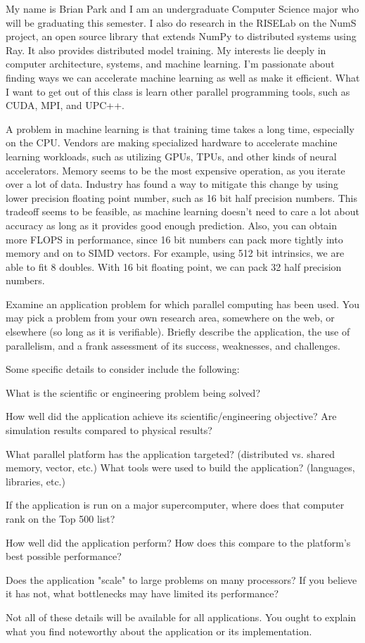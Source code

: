 \documentclass[11pt]{article}
\begin{document}
My name is Brian Park and I am an undergraduate Computer Science major who will be graduating this semester. I also do research in the RISELab on the NumS project, an open source library that extends NumPy to distributed systems using Ray. It also provides distributed model training. My interests lie deeply in computer architecture, systems, and machine learning. I'm passionate about finding ways we can accelerate machine learning as well as make it efficient. What I want to get out of this class is learn other parallel programming tools, such as CUDA, MPI, and UPC++.

A problem in machine learning is that training time takes a long time, especially on the CPU. Vendors are making specialized hardware to accelerate machine learning workloads, such as utilizing GPUs, TPUs, and other kinds of neural accelerators. Memory seems to be the most expensive operation, as you iterate over a lot of data. Industry has found a way to mitigate this change by using lower precision floating point number, such as 16 bit half precision numbers. This tradeoff seems to be feasible, as machine learning doesn't need to care a lot about accuracy as long as it provides good enough prediction. Also, you can obtain more FLOPS in performance, since 16 bit numbers can pack more tightly into memory and on to SIMD vectors. For example, using 512 bit intrinsics, we are able to fit 8 doubles. With 16 bit floating point, we can pack 32 half precision numbers.




Examine an application problem for which parallel computing has been used. You may pick a problem from your own research area, somewhere on the web, or elsewhere (so long as it is verifiable). Briefly describe the application, the use of parallelism, and a frank assessment of its success, weaknesses, and challenges.

Some specific details to consider include the following:

What is the scientific or engineering problem being solved?

How well did the application achieve its scientific/engineering objective? Are simulation results compared to physical results?

What parallel platform has the application targeted? (distributed vs. shared memory, vector, etc.) What tools were used to build the application? (languages, libraries, etc.)

If the application is run on a major supercomputer, where does that computer rank on the Top 500 list?

How well did the application perform? How does this compare to the platform's best possible performance?

Does the application "scale" to large problems on many processors? If you believe it has not, what bottlenecks may have limited its performance?

Not all of these details will be available for all applications. You ought to explain what you find noteworthy about the application or its implementation.
\end{document}
